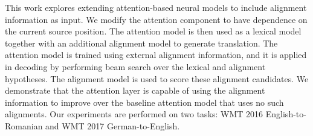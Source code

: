 This work explores extending attention-based neural models to include alignment information as input. We modify the attention component to have dependence on the current source  position. The attention model is then used as a lexical model together with an additional alignment model to generate translation. The attention model is trained using external alignment information, and it is applied in decoding by performing beam search over the lexical and alignment hypotheses. The alignment model is used to score these alignment candidates. We demonstrate that the attention layer is capable of using the alignment information to improve over the baseline attention model that uses no such alignments. Our experiments are performed on two tasks: WMT 2016 English-to-Romanian and WMT 2017 German-to-English.
